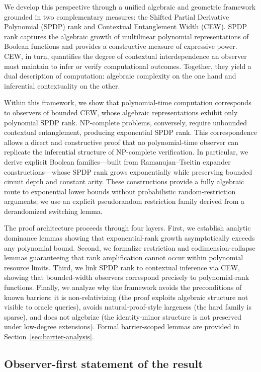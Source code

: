 \documentclass[12pt]{article}
\theoremstyle{definition}
\theoremstyle{definition}
\theoremstyle{remark}
\theoremstyle{remark}
\begin{document}
We develop this perspective through a unified algebraic and geometric framework grounded in two complementary measures: the Shifted Partial Derivative Polynomial (SPDP) rank and Contextual Entanglement Width (CEW). SPDP rank captures the algebraic growth of multilinear polynomial representations of Boolean functions and provides a constructive measure of expressive power. CEW, in turn, quantifies the degree of contextual interdependence an observer must maintain to infer or verify computational outcomes. Together, they yield a dual description of computation: algebraic complexity on the one hand and inferential contextuality on the other.

Within this framework, we show that polynomial-time computation corresponds to observers of bounded CEW, whose algebraic representations exhibit only polynomial SPDP rank. NP-complete problems, conversely, require unbounded contextual entanglement, producing exponential SPDP rank. This correspondence allows a direct and constructive proof that no polynomial-time observer can replicate the inferential structure of NP-complete verification. In particular, we derive explicit Boolean families---built from Ramanujan--Tseitin expander constructions---whose SPDP rank grows exponentially while preserving bounded circuit depth and constant arity. These constructions provide a fully algebraic route to exponential lower bounds without probabilistic random-restriction arguments; we use an explicit pseudorandom restriction family derived from a derandomized switching lemma.

The proof architecture proceeds through four layers. First, we establish analytic dominance lemmas showing that exponential-rank growth asymptotically exceeds any polynomial bound. Second, we formalize restriction and codimension-collapse lemmas guaranteeing that rank amplification cannot occur within polynomial resource limits. Third, we link SPDP rank to contextual inference via CEW, showing that bounded-width observers correspond precisely to polynomial-rank functions. Finally, we analyze why the framework avoids the preconditions of known barriers: it is non-relativizing (the proof exploits algebraic structure not visible to oracle queries), avoids natural-proof-style largeness (the hard family is sparse), and does not algebrize (the identity-minor structure is not preserved under low-degree extensions). Formal barrier-scoped lemmas are provided in Section~\ref{sec:barrier-analysis}.

\subsection{Observer-first statement of the result}
\label{subsec:observer-first}
\end{document}
